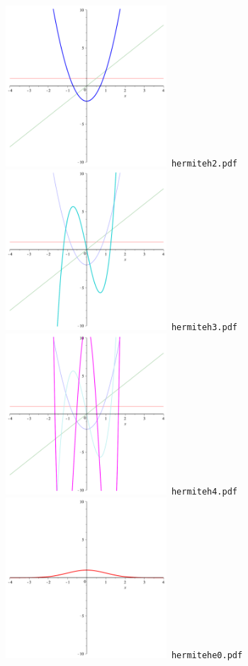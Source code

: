 \documentclass[a4paper]{amsart}
\begin{document}
\includegraphics[width=6cm]{hermiteh2.pdf}\verb+ hermiteh2.pdf+\\
\includegraphics[width=6cm]{hermiteh3.pdf}\verb+ hermiteh3.pdf+\\
\includegraphics[width=6cm]{hermiteh4.pdf}\verb+ hermiteh4.pdf+\\
\includegraphics[width=6cm]{hermitehe0.pdf}\verb+ hermitehe0.pdf+\\
\end{document}
